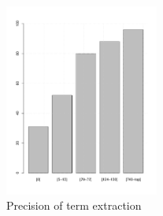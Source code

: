 \documentclass[Journal, InsideFigs, DoubleSpace]{ascelike} %
\begin{document}
\begin{figure}[t]
	\centering
	\includegraphics[width=0.45\textwidth]{term_extraction_precision}
	\caption{Precision of term extraction}
	\label{fig:term_precision}
\end{figure}
\end{document}
